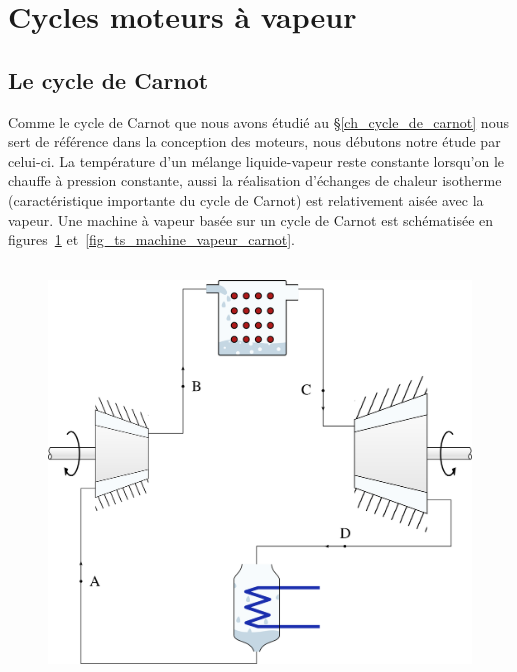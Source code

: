 \section{Cycles moteurs à vapeur}

	\subsection{Le cycle de Carnot}

		Comme le cycle de Carnot que nous avons étudié au \S\ref{ch_cycle_de_carnot} nous sert de référence dans la conception des moteurs, nous débutons notre étude par celui-ci. La température d’un mélange liquide-vapeur reste constante lorsqu’on le chauffe à pression constante, aussi la réalisation d’échanges de chaleur isotherme (caractéristique importante du cycle de Carnot) est relativement aisée avec la vapeur. Une machine à vapeur basée sur un cycle de Carnot est schématisée en figures~\ref{fig_machine_vapeur_carnot} et~\ref{fig_ts_machine_vapeur_carnot}.

		\begin{figure}
			\begin{center}
				\includegraphics[height=11cm]{images/circuit_carnot_lv.png}
			\end{center}
			\label{fig_machine_vapeur_carnot}
		\end{figure}

